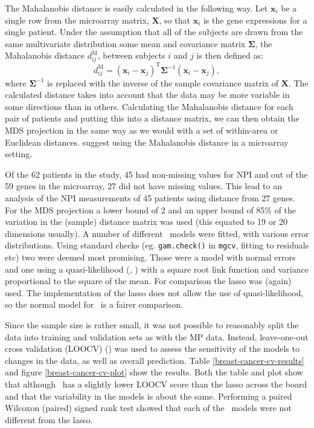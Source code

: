 The Mahalanobis distance is easily calculated in the following way. Let $\mathbf{x}_{i}$ be a single row from the microarray matrix, $\mathbf{X}$, so that $\mathbf{x}_{i}$ is the gene expressions for a single patient. Under the assumption that all of the subjects are drawn from the same multivariate distribution some mean and covariance matrix $\mathbf{\Sigma}$, the Mahalanobis distance $d^\text{M}_{ij}$, between subjects $i$ and $j$ is then defined as:
\begin{equation}
d^\text{M}_{ij} = (\mathbf{x}_{i} - \mathbf{x}_{j})^\text{T} \mathbf{\Sigma}^{-1} (\mathbf{x}_{i} - \mathbf{x}_{j}),
\end{equation}
where $\mathbf{\Sigma}^{-1}$ is replaced with the inverse of the sample covariance matrix of $\mathbf{X}$. The calculated distance takes into account that the data may be more variable in some directions than in others. Calculating the Mahalanobis distance for each pair of patients and putting this into a distance matrix, we can then obtain the MDS projection in the same way as we would with a set of within-area or Euclidean distances.  suggest using the Mahalanobis distance in a microarray setting.

Of the 62 patients in the study, 45 had non-missing values for NPI and out of the 59 genes in the microarray, 27 did not have missing values. This lead to an analysis of  the NPI measurements of 45 patients using distance from 27 genes. For the MDS projection a lower bound of 2 and an upper bound of 85\% of the variation in the (sample) distance matrix was used (this equated to 19 or 20 dimensions usually). A number of different \mdsds\ models were fitted, with various error distributions. Using standard checks (eg. \texttt{gam.check()} in \texttt{mgcv}, fitting to residuals etc) two were deemed most promising. Those were a model with normal errors and one using a quasi-likelihood (\cite{quasi}, \cite{wood2008}) with a square root link function and variance proportional to the square of the mean. For comparison the lasso was (again) used. The implementation of the lasso does not allow the use of quasi-likelihood, so the normal model for \mdsds\ is a fairer comparison. 

Since the sample size is rather small, it was not possible to reasonably split the data into training and validation sets as with the MP data. Instead, leave-one-out cross validation (LOOCV) () was used to assess the sensitivity of the models to changes in the data, as well as overall prediction. Table \ref{breast-cancer-cv-results} and figure \ref{breast-cancer-cv-plot} show the results. Both the table and plot show that although \mdsds\ has a slightly lower LOOCV score than the lasso across the board and that the variability in the models is about the same. Performing a paired Wilcoxon (paired) signed rank test showed that each of the \mdsds\ models were not different from the lasso.

